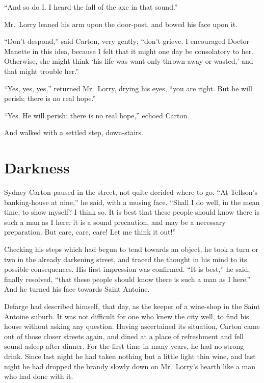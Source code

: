 ``And so do I. I heard the fall of the axe in that sound.''

Mr.\ Lorry leaned his arm upon the door-post, and bowed his face upon it.

``Don't despond,'' said Carton, very gently; ``don't grieve.
I encouraged Doctor Manette in this idea, because I felt that it
might one day be consolatory to her.  Otherwise, she might think `his
life was want only thrown away or wasted,' and that might trouble her.''

``Yes, yes, yes,'' returned Mr.\ Lorry, drying his eyes, ``you are
right. But he will perish; there is no real hope.''

``Yes.  He will perish:  there is no real hope,'' echoed Carton.

And walked with a settled step, down-stairs.



\chapter{Darkness}


Sydney Carton paused in the street, not quite decided where to go.
``At Tellson's banking-house at nine,'' he said, with a musing face.
``Shall I do well, in the mean time, to show myself?  I think so.
It is best that these people should know there is such a man as I
here; it is a sound precaution, and may be a necessary preparation.
But care, care, care!  Let me think it out!''

Checking his steps which had begun to tend towards an object, he took
a turn or two in the already darkening street, and traced the thought
in his mind to its possible consequences.  His first impression was
confirmed.  ``It is best,'' he said, finally resolved, ``that these
people should know there is such a man as I here.''  And he turned his
face towards Saint Antoine.

Defarge had described himself, that day, as the keeper of a wine-shop
in the Saint Antoine suburb.  It was not difficult for one who knew
the city well, to find his house without asking any question.  Having
ascertained its situation, Carton came out of those closer streets
again, and dined at a place of refreshment and fell sound asleep
after dinner.  For the first time in many years, he had no strong drink.
Since last night he had taken nothing but a little light thin wine,
and last night he had dropped the brandy slowly down on Mr.\ Lorry's
hearth like a man who had done with it.

